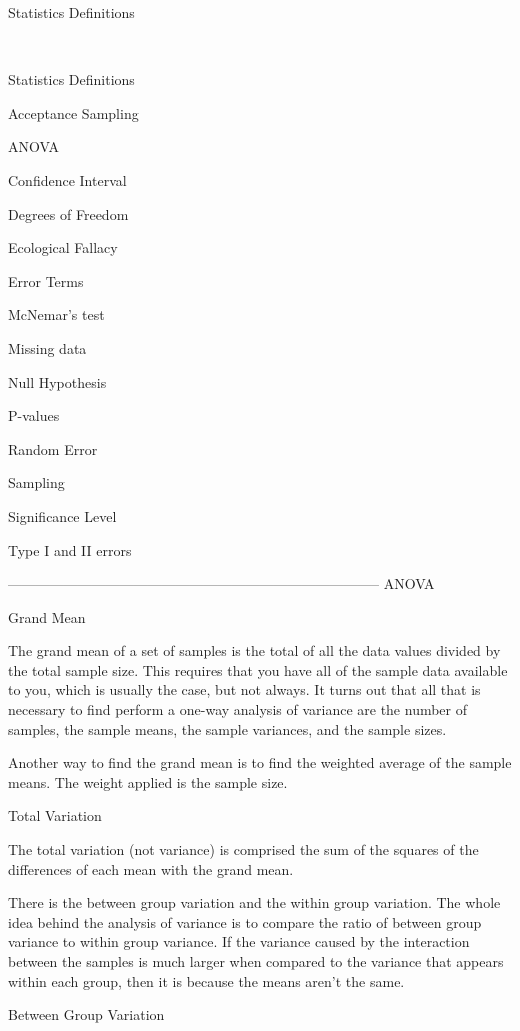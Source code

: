 
Statistics Definitions

 



Statistics Definitions

Acceptance Sampling

ANOVA

Confidence Interval

Degrees of Freedom

Ecological Fallacy

Error Terms

McNemar's test

Missing data

Null Hypothesis

P-values

Random Error

Sampling

Significance Level

Type I and II errors





--------------------------------------------------------------------------------
ANOVA



Grand Mean


The grand mean of a set of samples is the total of all the data values divided by the total sample size. This requires that you have all of the sample data available to you, which is usually the case, but not always. It turns out that all that is necessary to find perform a one-way analysis of variance are the number of samples, the sample means, the sample variances, and the sample sizes.

Another way to find the grand mean is to find the weighted average of the sample means. The weight applied is the sample size.


Total Variation


The total variation (not variance) is comprised the sum of the squares of the differences of each mean with the grand mean.

There is the between group variation and the within group variation. The whole idea behind the analysis of variance is to compare the ratio of between group variance to within group variance. If the variance caused by the interaction between the samples is much larger when compared to the variance that appears within each group, then it is because the means aren't the same.

Between Group Variation


